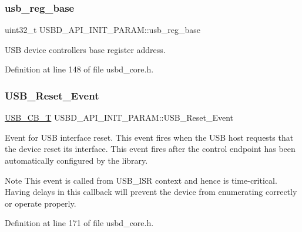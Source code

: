 \subsubsection{\texorpdfstring{usb\+\_\+reg\+\_\+base}{usb\_reg\_base}}
{\footnotesize\ttfamily uint32\+\_\+t U\+S\+B\+D\+\_\+\+A\+P\+I\+\_\+\+I\+N\+I\+T\+\_\+\+P\+A\+R\+A\+M\+::usb\+\_\+reg\+\_\+base}

U\+SB device controller\textquotesingle{}s base register address. 

Definition at line 148 of file usbd\+\_\+core.\+h.

\mbox{\label{struct_u_s_b_d___a_p_i___i_n_i_t___p_a_r_a_m_a49f0d2a8b163486e07cfea83b436234f}} 
\subsubsection{\texorpdfstring{U\+S\+B\+\_\+\+Reset\+\_\+\+Event}{USB\_Reset\_Event}}
{\footnotesize\ttfamily \hyperlink{group___u_s_b_d___core_ga0404ce046312aa5c798cc4a05c417e46}{U\+S\+B\+\_\+\+C\+B\+\_\+T} U\+S\+B\+D\+\_\+\+A\+P\+I\+\_\+\+I\+N\+I\+T\+\_\+\+P\+A\+R\+A\+M\+::\+U\+S\+B\+\_\+\+Reset\+\_\+\+Event}

Event for U\+SB interface reset. This event fires when the U\+SB host requests that the device reset its interface. This event fires after the control endpoint has been automatically configured by the library. ~\newline
\begin{DoxyNote}{Note}
This event is called from U\+S\+B\+\_\+\+I\+SR context and hence is time-\/critical. Having delays in this callback will prevent the device from enumerating correctly or operate properly. 
\end{DoxyNote}


Definition at line 171 of file usbd\+\_\+core.\+h.

\mbox{\label{struct_u_s_b_d___a_p_i___i_n_i_t___p_a_r_a_m_a2fb170236fa92a20f29dc8c13b24a1d1}} 
